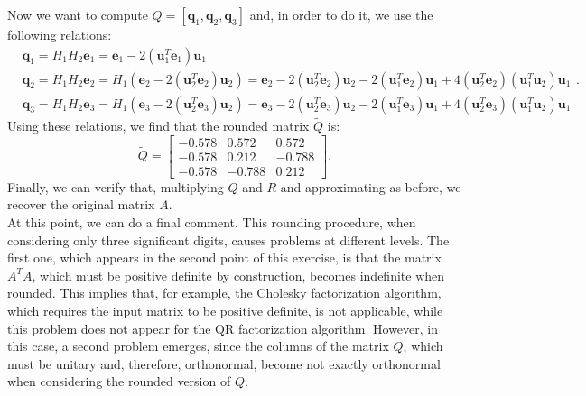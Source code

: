 \documentclass[a4paper,11pt]{article}
\begin{document}
Now we want to compute $Q=[\textbf{q}_1,\textbf{q}_2,\textbf{q}_3]$ and, in order to do it, we use the following relations:
\begin{equation}\label{key}
	\begin{split}
		&\textbf{q}_1 = H_1 H_2 \textbf{e}_1 = \textbf{e}_1 - 2 (\textbf{u}_1^T \textbf{e}_1) \textbf{u}_1\\
		&  \textbf{q}_2 = H_1 H_2 \textbf{e}_2 = H_1 (\textbf{e}_2 - 2 (\textbf{u}_2^T \textbf{e}_2) \textbf{u}_2) =  \textbf{e}_2 - 2 (\textbf{u}_2^T \textbf{e}_2) \textbf{u}_2 -  2 (\textbf{u}_1^T \textbf{e}_2) \textbf{u}_1  + 4 (\textbf{u}_2^T \textbf{e}_2)(\textbf{u}_1^T \textbf{u}_2)\textbf{u}_1\\
		&  \textbf{q}_3 = H_1 H_2 \textbf{e}_3 = H_1 (\textbf{e}_3 - 2 (\textbf{u}_2^T \textbf{e}_3) \textbf{u}_2) =  \textbf{e}_3 - 2 (\textbf{u}_2^T \textbf{e}_3) \textbf{u}_2 -  2 (\textbf{u}_1^T \textbf{e}_3) \textbf{u}_1  + 4 (\textbf{u}_2^T \textbf{e}_3)(\textbf{u}_1^T \textbf{u}_2)\textbf{u}_1
	\end{split}.
\end{equation}
Using these relations, we find that the rounded matrix $\tilde{Q}$ is:
\begin{equation}\label{key}
	\tilde{Q} = \begin{bmatrix}
		-0.578& 0.572 & 0.572 \\
		-0.578& 0.212 & -0.788 \\
		-0.578& -0.788 & 0.212
	\end{bmatrix}.
\end{equation}
Finally, we can verify that, multiplying $\tilde{Q}$ and $\tilde{R}$ and approximating as before, we recover the original matrix $A$.\\

\noindent At this point, we can do a final comment. This rounding procedure, when considering only three significant digits, causes problems at different levels. The first one, which appears in the second point of this exercise, is that the matrix $A^{T}A$, which must be positive definite by construction, becomes indefinite when rounded. This implies that, for example, the Cholesky factorization algorithm, which requires the input matrix to be positive definite, is not applicable, while this problem does not appear for the QR factorization algorithm. However, in this case, a second problem emerges, since the columns of the matrix $Q$, which must be unitary and, therefore, orthonormal, become not exactly orthonormal when considering the rounded version of $Q$.\\
%
%
%
\end{document}
